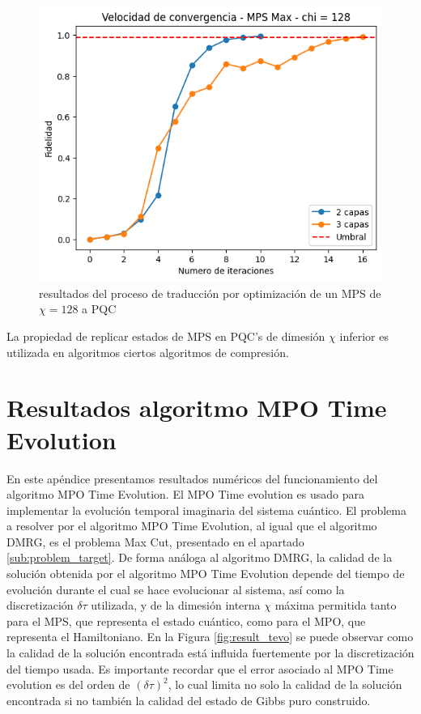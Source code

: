\begin{figure}[!h]
    \centering
    \includegraphics[scale = 0.7]{plt/a04-mps_to_pqc_o.png}
    \caption{resultados del proceso de traducción por optimización de un MPS de $\chi = 128$ a PQC}
    \label{fig:r_mps_to_pqc_o}
\end{figure}

La propiedad de replicar estados de MPS en PQC's de dimesión $\chi$ inferior es utilizada en algoritmos ciertos algoritmos de compresión.

\section{Resultados algoritmo MPO Time Evolution}
\label{apendix:mpo_time_evolution}

En este apéndice presentamos resultados numéricos del funcionamiento del algoritmo MPO Time Evolution. El MPO Time evolution es usado para implementar la evolución temporal imaginaria del sistema cuántico. El problema a resolver por el algoritmo MPO Time Evolution, al igual que el algoritmo DMRG, es el problema Max Cut, presentado en el apartado \ref{sub:problem_target}. De forma análoga al algoritmo DMRG, la calidad de la solución obtenida por el algoritmo MPO Time Evolution depende del tiempo de evolución durante el cual se hace evolucionar al sistema, así como la discretización $\delta \tau$ utilizada, y de la dimesión interna $\chi$ máxima permitida tanto para el MPS, que representa el estado cuántico, como para el MPO, que representa el Hamiltoniano. En la Figura \ref{fig:result_tevo} se puede observar como la calidad de la solución encontrada está influida fuertemente por la discretización del tiempo usada. Es importante recordar que el error asociado al MPO Time evolution es del orden de $(\delta \tau)^2$, lo cual limita no solo la calidad de la solución encontrada si no también la calidad del estado de Gibbs puro construido.

